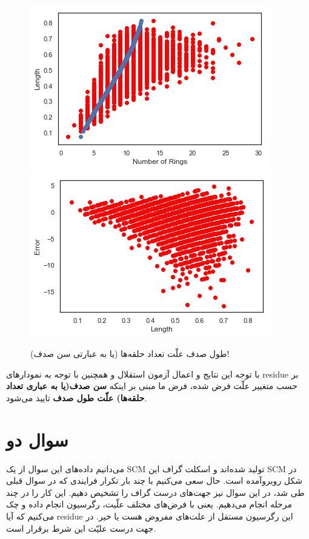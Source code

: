 \documentclass{article}
\begin{document}
\begin{figure}[h!]
\centering
\begin{floatrow}
\includegraphics[scale=0.4]{aba_back1.png}
\includegraphics[scale=0.4]{aba_back2.png}
\end{floatrow}
\caption{طول صدف علّت تعداد حلقه‌ها (یا به عبارتی سن صدف)!}
\label{wrong}
\end{figure}
با توجه این نتایج و اعمال آزمون استقلال و همچنین با توجه به نمودارهای residue بر حسب متغییر علّت فرض شده، فرض ما مبنی بر اینکه
\textbf{سن صدف(یا به عباری تعداد حلقه‌ها) علّت طول صدف}
تایید می‌شود. 
\newpage
\section{سوال دو}
می‌دانیم داده‌های این سوال از یک SCM تولید شده‌اند و اسکلت گراف این SCM در شکل روبروآمده است. حال سعی می‌کنیم با چند بار تکرار فرایندی که در سوال قبلی طی شد، در این سوال نیز جهت‌‌های درست گراف را تشخیص دهیم.  این کار را در چند مرحله انجام می‌دهیم. یعنی با فرض‌های مختلف علّیت، رگرسیون انجام داده و چک می‌کنیم که آیا residue این رگرسیون مستقل از علت‌های مفروض هست یا خیر. در جهت درست علیّت این شرط برقرار است.
\end{document}
